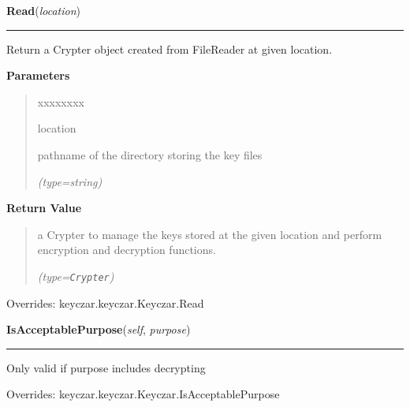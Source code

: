 \hspace{.8\funcindent}\begin{boxedminipage}{\funcwidth}

    \raggedright \textbf{Read}(\textit{location})

    \vspace{-1.5ex}

    \rule{\textwidth}{0.5\fboxrule}
\setlength{\parskip}{2ex}
    Return a Crypter object created from FileReader at given location.

\setlength{\parskip}{1ex}
      \textbf{Parameters}
      \vspace{-1ex}

      \begin{quote}
        \begin{Ventry}{xxxxxxxx}

          \item[location]

          pathname of the directory storing the key files

            {\it (type=string)}

        \end{Ventry}

      \end{quote}

      \textbf{Return Value}
    \vspace{-1ex}

      \begin{quote}
      a Crypter to manage the keys stored at the given location and perform
      encryption and decryption functions.

      {\it (type=\texttt{Crypter})}

      \end{quote}

      Overrides: keyczar.keyczar.Keyczar.Read

    \end{boxedminipage}

    \vspace{0.5ex}

\hspace{.8\funcindent}\begin{boxedminipage}{\funcwidth}

    \raggedright \textbf{IsAcceptablePurpose}(\textit{self}, \textit{purpose})

    \vspace{-1.5ex}

    \rule{\textwidth}{0.5\fboxrule}
\setlength{\parskip}{2ex}
    Only valid if purpose includes decrypting

\setlength{\parskip}{1ex}
      Overrides: keyczar.keyczar.Keyczar.IsAcceptablePurpose

    \end{boxedminipage}

